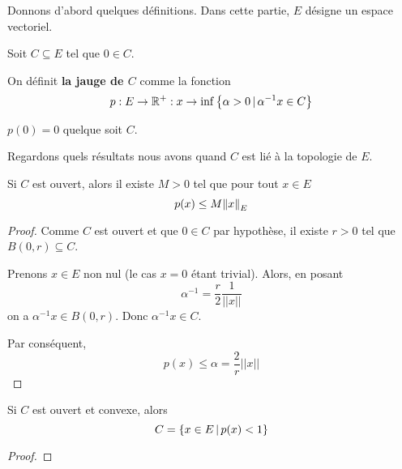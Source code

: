 Donnons d'abord quelques définitions. Dans cette partie, $E$ désigne un espace
vectoriel.

\begin{definition} [Jauge]
	Soit $C \subseteq E$ tel que $0 \in C$.

	On définit \textbf{la jauge de $C$} comme la fonction
	\begin{equation}
		p : E \rightarrow \mathbb{R}^{+} : x \rightarrow \inf \left\{\alpha >
		0 \, | \, \alpha^{-1}x \in C \right\}
	\end{equation}
\end{definition}

\begin{exercice}
	$p(0) = 0$ quelque soit $C$.
\end{exercice}

Regardons quels résultats nous avons quand $C$ est lié à la topologie de $E$.

\begin{proposition}
	Si $C$ est ouvert, alors il existe $M > 0$ tel que pour tout $x \in E$
	\begin{equation}
		p(x) \leq M \norm{x}_{E}
	\end{equation}
\end{proposition}

\ifdefined\outputproof
\begin{proof}

	Comme $C$ est ouvert et que $0 \in C$ par hypothèse, il existe $r > 0$ tel
	que $B(0, r) \subseteq C$.

	Prenons $x \in E$ non nul (le cas $x = 0$ étant trivial).
	Alors, en posant
	\begin{equation}
		\alpha^{-1} = \frac{r}{2} \frac{1}{||x||}
	\end{equation}
	on a $\alpha^{-1} x \in B(0, r)$.
	Donc $\alpha^{-1} x \in C$.

	Par conséquent,
	\begin{equation}
		p(x) \leq \alpha = \frac{2}{r} ||x||
	\end{equation}
\end{proof}
\fi

\begin{proposition}
	Si $C$ est ouvert et convexe, alors
	\begin{equation}
		C = \left\{x \in E \, | \, p(x) < 1 \right\}
	\end{equation}
\end{proposition}

\ifdefined\outputproof
\begin{proof}

\end{proof}
\fi

